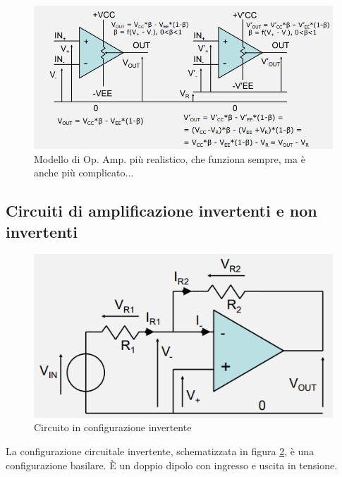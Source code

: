 \documentclass{article}
\begin{document}
\begin{figure}[h]
  \centering
  \includegraphics[scale=0.57]{IM_amplificatore_operazionale_reale}
  \caption{Modello di Op. Amp. più realistico, che funziona sempre, ma è anche più complicato...}
  \label{Schema_amplificatore_operazionale_reale}
\end{figure}







\clearpage
\subsection{Circuiti di amplificazione invertenti e non invertenti}

\begin{figure}[h]
  \centering
  \includegraphics[scale=0.7]{IM_circuito_invertente}
  \caption{Circuito in configurazione invertente}
  \label{Schema_circuito_invertente}
\end{figure}

La configurazione circuitale invertente, schematizzata in figura \ref{Schema_circuito_invertente}, è una configurazione basilare. È un doppio dipolo con ingresso e uscita in tensione. 
\end{document}
